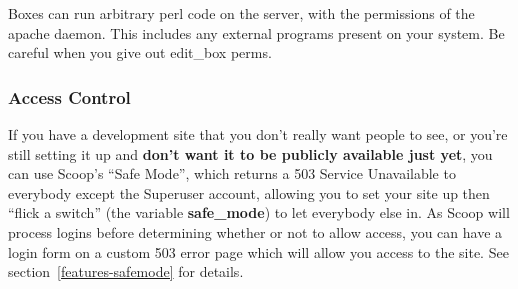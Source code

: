 Boxes can run arbitrary perl code on the server, with the permissions of the apache daemon. This includes any external programs present on your system. Be careful when you give out edit\_box perms.

\subsubsection{Access Control}

If you have a development site that you don't really want people to see, or you're still setting it up and {\bf don't want it to be publicly available just yet}, you can use Scoop's ``Safe Mode'', which returns a 503 Service Unavailable to everybody except the Superuser account, allowing you to set your site up then ``flick a switch'' (the variable {\bf safe\_mode}) to let everybody else in. As Scoop will process logins before determining whether or not to allow access, you can have a login form on a custom 503 error page which will allow you access to the site. See section~\ref{features-safemode} for details.

